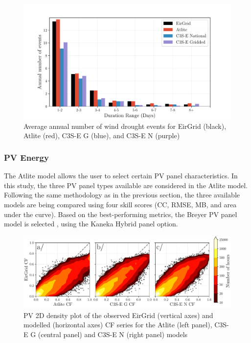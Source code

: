\documentclass[a4paper, 11pt]{article}
\begin{document}
\begin{figure}[!ht]
	\centering
	\includegraphics[width=\textwidth]{verification_wind_bar}
	\caption{Average annual number of wind drought events for EirGrid (black), Atlite (red), C3S-E G (blue), and C3S-E N (purple)}
	\label{fig:bar_number_events_verification_wind}
\end{figure}

\newpage
\subsubsection{PV Energy}
\label{sec:pv_verification}

The Atlite model allows the user to select certain PV panel characteristics. In this study, the three PV panel types available are considered in the Atlite model. Following the same methodology as in the previous section, the three available models are being compared using four skill scores (CC, RMSE, MB, and area under the curve). Based on the best-performing metrics, the Breyer PV panel model is selected \cite{beyer2004pv}, using the Kaneka Hybrid panel option.

\begin{figure}[h!]
	\centering
	\includegraphics[width=\textwidth]{verification_pv_contour}
	\caption{PV 2D density plot of the observed EirGrid (vertical axes) and modelled (horizontal axes) CF series for the Atlite  (left panel), C3S-E G (central panel) and C3S-E N (right panel) models}	
	\label{fig:solar_verification_contour}
\end{figure}
\end{document}
